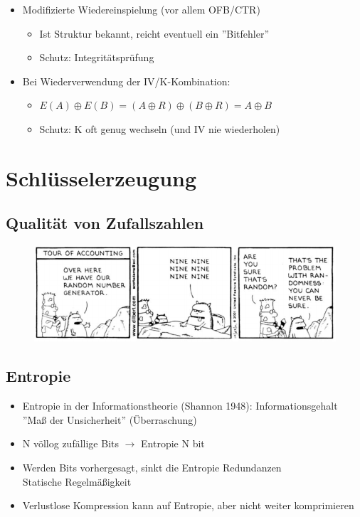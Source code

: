 \documentclass[openany]{book}
\begin{document}
\begin{itemize}
    \item Modifizierte Wiedereinspielung (vor allem OFB/CTR)
    \begin{itemize}
        \item Ist Struktur bekannt, reicht eventuell ein ''Bitfehler''
        \item Schutz: Integritätsprüfung 
    \end{itemize}
    \item Bei Wiederverwendung der IV/K-Kombination:
    \begin{itemize}
        \item $E(A)\oplus E(B)=(A\oplus R)\oplus (B\oplus R) = A\oplus B$
        \item Schutz: K oft genug wechseln (und IV nie wiederholen)
    \end{itemize}
\end{itemize}

\newpage

\section{Schlüsselerzeugung}

\subsection{Qualität von Zufallszahlen}

\begin{figure}[h!]
    \centering
    \includegraphics[width=\linewidth]{Pics/Random1.PNG}
\end{figure} 

\subsection{Entropie}

\begin{itemize}
    \item Entropie in der Informationstheorie (Shannon 1948): Informationsgehalt \\ ''Maß der Unsicherheit'' (Überraschung)
    \item N völlog zufällige Bits $\rightarrow$ Entropie N bit
    \item Werden Bits vorhergesagt, sinkt die Entropie Redundanzen \\ Statische Regelmäßigkeit
    \item Verlustlose Kompression kann auf Entropie, aber nicht weiter komprimieren
\end{itemize}
\end{document}
